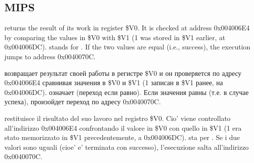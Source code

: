 \subsection{MIPS}



\ifdefined\ENGLISH
\scanf returns the result of its work in register \$V0. It is checked at address 0x004006E4
by comparing the values in \$V0 with \$V1 (1 was stored in \$V1 earlier, at 0x004006DC).
 stands for .
If the two values are equal (i.e., success), the execution jumps to address 0x0040070C.
\fi

\ifdefined\RUSSIAN
\scanf возвращает результат своей работы в регистре \$V0 и он проверяется по адресу 0x004006E4
сравнивая значения в \$V0 и \$V1 (1 записан в \$V1 ранее, на 0x004006DC).
 означает  (переход если равно).
Если значения равны (т.е. в случае успеха), произойдет переход по адресу 0x0040070C.
\fi

\ifdefined\ITALIAN
\scanf restituisce il risultato del suo lavoro nel registro \$V0. Cio' viene controllato all'indirizzo 0x004006E4
confrontando il valore in \$V0 con quello in \$V1 (1 era stato memorizzato in \$V1 precedentemente, a 0x004006DC).
 sta per .
Se i due valori sono uguali (cioe' \scanf e' terminata con successo), l'esecuzione salta all'indirizzo 0x0040070C.
\fi